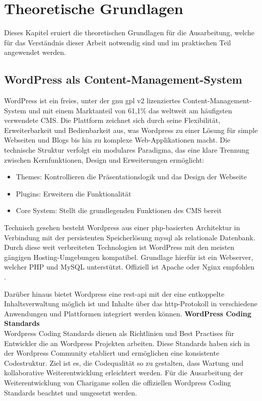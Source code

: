 \chapter{Theoretische Grundlagen}
Dieses Kapitel eruiert die theoretischen Grundlagen für die Ausarbeitung, welche für das Verständnis dieser Arbeit notwendig sind und im praktischen Teil angewendet werden.
\section{WordPress als Content-Management-System}
WordPress ist ein freies, unter der \gls{gnu} \gls{gpl} v2 lizenziertes Content-Management-System und mit einem Marktanteil von 61,1\% das weltweit am häufigsten verwendete CMS. \cite{statista2025cms}
Die Plattform zeichnet sich durch seine Flexibilität, Erweiterbarkeit und Bedienbarkeit aus, was Wordpress zu einer Lösung für simple Webseiten und Blogs bis hin zu komplexe Web-Applikationen macht. \cite{patel2019review}
Die technische Struktur verfolgt ein modulares Paradigma, das eine klare Trennung zwischen Kernfunktionen, Design und Erweiterungen ermöglicht:
\begin{itemize}

 \item Themes: Kontrollieren die Präsentationslogik und das Design der Webseite

 \item Plugins: Erweitern die Funktionalität

 \item Core System: Stellt die grundlegenden Funktionen des CMS bereit

\end{itemize}
Technisch gesehen besteht Wordpress aus einer \gls{php}-basierten Architektur in Verbindung mit der persistenten Speicherlösung \gls{mysql} als relationale Datenbank.
Durch diese weit verbreiteten Technologien ist WordPress mit den meisten gängigen Hosting-Umgebungen kompatibel.
Grundlage hierfür ist ein Webserver, welcher PHP und MySQL unterstützt.
Offiziell ist Apache oder Nginx empfohlen \cite{wordpress2024requirements}.

Darüber hinaus bietet Wordpress eine \gls{rest}-\gls{api} mit der eine entkoppelte Inhaltsverwaltung möglich ist und Inhalte über das \gls{http}-Protokoll in verschiedene Anwendungen und Plattformen integriert werden können.
\newpage
\textbf{WordPress Coding Standards}\\
Wordpress Coding Standards dienen als Richtlinien und Best Practises für Entwickler die an Wordpress Projekten arbeiten.
Diese Standards haben sich in der Wordpress Community etabliert und ermöglichen eine konsistente Codestruktur.
Ziel ist es, die Codequalität so zu gestalten, dass Wartung und kollaborative Weiterentwicklung erleichtert werden.
Für die Ausarbeitung der Weiterentwicklung von Charigame sollen die offiziellen Wordpress Coding Standards beachtet und umgesetzt werden.


